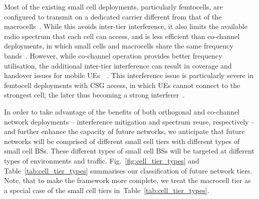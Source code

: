 \documentclass{IEEEtran}
\begin{document}
\begin{table*}
\begin{centering}
{\footnotesize \caption{\label{tab:cell_tier_types} Cell tier types and their characteristics.}}
\vspace{-0.1cm}
\par\end{centering}{\footnotesize \par}
\centering{}{\footnotesize }
\vspace{-0.1cm}
\end{table*}

Most of the existing small cell deployments,
particularly femtocells,
are configured to transmit on a dedicated carrier different from that of the macrocells~\cite{Claussen:08a}.
While this avoids inter-tier interference,
it also limits the available radio spectrum that each cell can access,
and is less efficient than co-channel deployments,
in which small cells and macrocells share the same frequency bands~\cite{Hobby:09a}.
However, while co-channel operation provides better frequency utilisation,
the additional inter-tier interference can result in coverage and handover issues for mobile \acp{UE}~\cite{Lopez-Perez2010a}~\cite{6384454}.
This interference issue is particularly severe in femtocell deployments with \ac{CSG} access,
in which \acp{UE} cannot connect to the strongest cell;
the later thus  becoming a strong interferer~\cite{Lopez-Perez2010a}.

In order to take advantage of the benefits of both orthogonal and co-channel network deployments
-- interference mitigation and spectrum reuse, respectively --
and further enhance the capacity of future networks,
we anticipate that future networks will be comprised of different small cell tiers with different types of small cell \acp{BS}.
These different types of small cell \acp{BS} will be targeted at different types of environments and traffic.
Fig.~\ref{fig:cell_tier_types} and Table~\ref{tab:cell_tier_types} summarises our classification of future network tiers.
Note, that to make the framework more complete, we treat the macrocell tier as a special case of the small cell tiers  in~Table~\ref{tab:cell_tier_types}.
\end{document}
